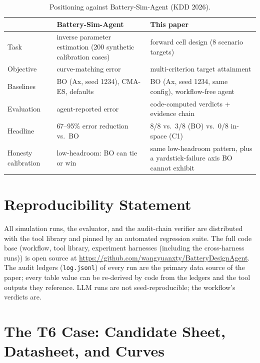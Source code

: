 \documentclass[review,11pt]{elsarticle}
\begin{document}
\begin{table}[!ht]
\centering
\caption{Positioning against Battery-Sim-Agent (KDD 2026).}
\label{tab:bsa}
\begin{tabular}{p{2.6cm}p{4.4cm}p{4.2cm}}
\toprule
 & Battery-Sim-Agent & This paper \\
\midrule
Task & inverse parameter estimation (200 synthetic calibration cases) & forward cell design (8 scenario targets) \\
Objective & curve-matching error & multi-criterion target attainment \\
Baselines & BO (Ax, seed 1234), CMA-ES, defaults & BO (Ax, seed 1234, same config), workflow-free agent \\
Evaluation & agent-reported error & code-computed verdicts + evidence chain \\
Headline & 67--95\% error reduction vs.\ BO & 8/8 vs.\ 3/8 (BO) vs.\ 0/8 in-space (C1) \\
Honesty calibration & low-headroom: BO can tie or win & same low-headroom pattern, plus a yardstick-failure axis BO cannot exhibit \\
\bottomrule
\end{tabular}
\end{table}

\section{Reproducibility Statement}

All simulation runs, the evaluator, and the audit-chain
verifier are distributed with the tool library and pinned by an automated
regression suite. The full code base (workflow, tool library, experiment
harnesses (including the cross-harness runs)) is open source at
\url{https://github.com/wangyuanxty/BatteryDesignAgent}. The audit ledgers (\texttt{log.jsonl}) of every run are
the primary data source of the paper; every table value can be re-derived
by code from the ledgers and the tool outputs they reference. LLM runs
are not seed-reproducible; the workflow's verdicts are.

\section{The T6 Case: Candidate Sheet, Datasheet, and Curves}
\end{document}
